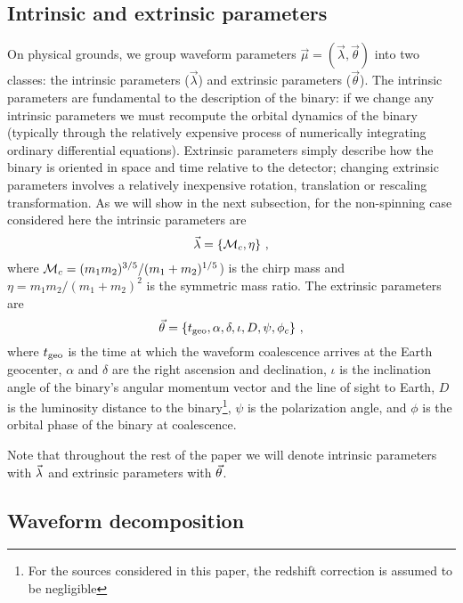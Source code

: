 \subsection{Intrinsic and extrinsic parameters}

On physical grounds, we group waveform parameters $\vec{\mu}=(\vec{\lambda},\vec{\theta})$ into two classes: the
intrinsic parameters ($\vec{\lambda}$) and extrinsic parameters ($\vec{\theta}$). 
The intrinsic parameters are fundamental to the description of the binary: if we change any intrinsic
parameters we must recompute the orbital dynamics of the binary (typically through the relatively expensive process
of numerically integrating ordinary differential equations). Extrinsic parameters simply describe how the
binary is oriented in space and time relative to the detector; changing extrinsic parameters involves a 
relatively inexpensive rotation, translation or rescaling transformation. As we will show in the next subsection, 
for the non-spinning case considered here the intrinsic parameters are
\begin{equation} \label{eq:intrinsic}
\vec{\lambda}=\{{{\cal M}_c},\eta\}\ ,
\end{equation}
where ${{\cal M}_c} = (m_1m_2)^{3/5}/(m_1+m_2)^{1/5}$) is the chirp mass and 
$\eta = m_1m_2/(m_1+m_2)^2$ is the symmetric mass ratio.
The extrinsic parameters are
\begin{equation} \label{eq:extrinsic}
\vec{\theta}=\{t_{\rm geo},\alpha,\delta,\iota,D,\psi,\phi_c\}\ ,
\end{equation}
where $t_{\rm geo}$ is the time at which the waveform coalescence arrives at the Earth geocenter,
$\alpha$ and $\delta$ are the right ascension and declination, 
$\iota$ is the inclination angle of the binary's angular momentum vector and the line of sight to Earth, 
$D$ is the luminosity distance to the binary\footnote{For the sources considered in this paper, 
	the redshift correction is assumed to be negligible}, 
$\psi$ is the polarization angle, and $\phi$ is the orbital phase of the binary at coalescence.

Note that throughout the rest of the paper we will denote intrinsic parameters with $\vec{\lambda}$ 
and extrinsic parameters with $\vec{\theta}$.

\subsection{Waveform decomposition}

